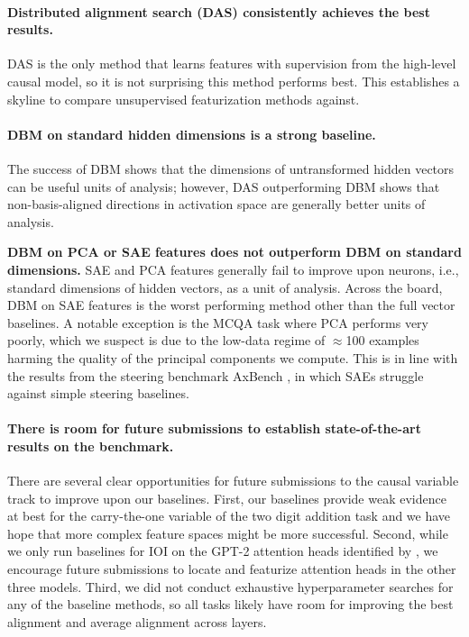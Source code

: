 \documentclass{article}
\theoremstyle{plain}
\theoremstyle{definition}
\theoremstyle{remark}
\begin{document}
\paragraph{Distributed alignment search (DAS) consistently achieves the best results.} DAS is the only method that learns features with supervision from the high-level causal model, so it is not surprising this method performs best. This establishes a skyline to compare unsupervised featurization methods against.


\paragraph{DBM on standard hidden dimensions is a strong baseline.}
The success of DBM shows that the dimensions of untransformed hidden vectors can be useful units of analysis; however, DAS outperforming DBM shows that non-basis-aligned directions in activation space are generally better units of analysis. 

\textbf{DBM on PCA or SAE features does not outperform DBM on standard dimensions.} SAE and PCA features generally fail to improve upon neurons, i.e., standard dimensions of hidden vectors, as a unit of analysis. 
Across the board, DBM on SAE features is the worst performing method other than the full vector baselines. A notable exception is the MCQA task where PCA performs very poorly, which we suspect is due to the low-data regime of $\approx$100 examples harming the quality of the principal components we compute. This is in line with the results from the steering benchmark AxBench \cite{wu2025axbenchsteeringllmssimple}, in which SAEs struggle against simple steering baselines. 

\paragraph{There is room for future submissions to establish state-of-the-art results on the benchmark.} There are several clear opportunities for future submissions to the causal variable track to improve upon our baselines. First, our baselines provide weak evidence at best for the carry-the-one variable of the two digit addition task and we have hope that more complex feature spaces might be more successful. Second, while we only run baselines for IOI on the GPT-2 attention heads identified by \cite{wang2022interpretability}, we encourage future submissions to locate and featurize attention heads in the other three models. Third, we did not conduct exhaustive hyperparameter searches for any of the baseline methods, so all tasks likely have room for improving the best alignment and average alignment across layers.
\end{document}
